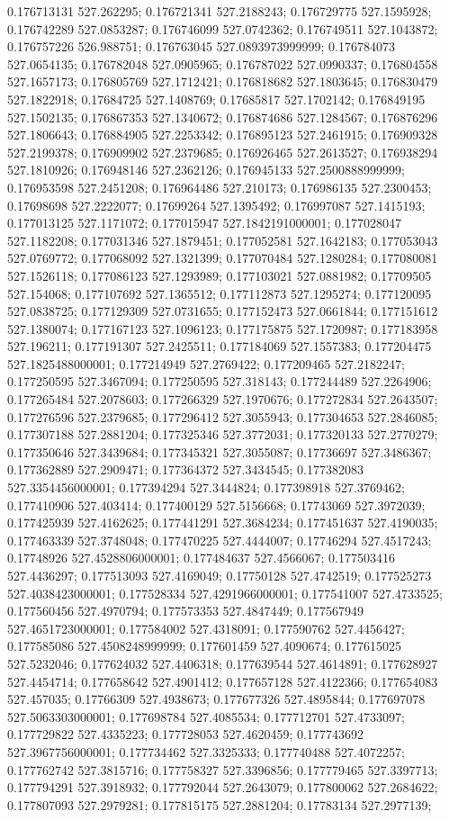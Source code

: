 0.176713131 527.262295; 0.176721341 527.2188243; 0.176729775 527.1595928; 0.176742289 527.0853287; 0.176746099 527.0742362; 0.176749511 527.1043872; 0.176757226 526.988751; 0.176763045 527.0893973999999; 0.176784073 527.0654135; 0.176782048 527.0905965; 0.176787022 527.0990337; 0.176804558 527.1657173; 0.176805769 527.1712421; 0.176818682 527.1803645; 0.176830479 527.1822918; 0.17684725 527.1408769; 0.17685817 527.1702142; 0.176849195 527.1502135; 0.176867353 527.1340672; 0.176874686 527.1284567; 0.176876296 527.1806643; 0.176884905 527.2253342; 0.176895123 527.2461915; 0.176909328 527.2199378; 0.176909902 527.2379685; 0.176926465 527.2613527; 0.176938294 527.1810926; 0.176948146 527.2362126; 0.176945133 527.2500888999999; 0.176953598 527.2451208; 0.176964486 527.210173; 0.176986135 527.2300453; 0.17698698 527.2222077; 0.17699264 527.1395492; 0.176997087 527.1415193; 0.177013125 527.1171072; 0.177015947 527.1842191000001; 0.177028047 527.1182208; 0.177031346 527.1879451; 0.177052581 527.1642183; 0.177053043 527.0769772; 0.177068092 527.1321399; 0.177070484 527.1280284; 0.177080081 527.1526118; 0.177086123 527.1293989; 0.177103021 527.0881982; 0.17709505 527.154068; 0.177107692 527.1365512; 0.177112873 527.1295274; 0.177120095 527.0838725; 0.177129309 527.0731655; 0.177152473 527.0661844; 0.177151612 527.1380074; 0.177167123 527.1096123; 0.177175875 527.1720987; 0.177183958 527.196211; 0.177191307 527.2425511; 0.177184069 527.1557383; 0.177204475 527.1825488000001; 0.177214949 527.2769422; 0.177209465 527.2182247; 0.177250595 527.3467094; 0.177250595 527.318143; 0.177244489 527.2264906; 0.177265484 527.2078603; 0.177266329 527.1970676; 0.177272834 527.2643507; 0.177276596 527.2379685; 0.177296412 527.3055943; 0.177304653 527.2846085; 0.177307188 527.2881204; 0.177325346 527.3772031; 0.177320133 527.2770279; 0.177350646 527.3439684; 0.177345321 527.3055087; 0.17736697 527.3486367; 0.177362889 527.2909471; 0.177364372 527.3434545; 0.177382083 527.3354456000001; 0.177394294 527.3444824; 0.177398918 527.3769462; 0.177410906 527.403414; 0.177400129 527.5156668; 0.17743069 527.3972039; 0.177425939 527.4162625; 0.177441291 527.3684234; 0.177451637 527.4190035; 0.177463339 527.3748048; 0.177470225 527.4444007; 0.17746294 527.4517243; 0.17748926 527.4528806000001; 0.177484637 527.4566067; 0.177503416 527.4436297; 0.177513093 527.4169049; 0.17750128 527.4742519; 0.177525273 527.4038423000001; 0.177528334 527.4291966000001; 0.177541007 527.4733525; 0.177560456 527.4970794; 0.177573353 527.4847449; 0.177567949 527.4651723000001; 0.177584002 527.4318091; 0.177590762 527.4456427; 0.177585086 527.4508248999999; 0.177601459 527.4090674; 0.177615025 527.5232046; 0.177624032 527.4406318; 0.177639544 527.4614891; 0.177628927 527.4454714; 0.177658642 527.4901412; 0.177657128 527.4122366; 0.177654083 527.457035; 0.17766309 527.4938673; 0.177677326 527.4895844; 0.177697078 527.5063303000001; 0.177698784 527.4085534; 0.177712701 527.4733097; 0.177729822 527.4335223; 0.177728053 527.4620459; 0.177743692 527.3967756000001; 0.177734462 527.3325333; 0.177740488 527.4072257; 0.177762742 527.3815716; 0.177758327 527.3396856; 0.177779465 527.3397713; 0.177794291 527.3918932; 0.177792044 527.2643079; 0.177800062 527.2684622; 0.177807093 527.2979281; 0.177815175 527.2881204; 0.17783134 527.2977139; 